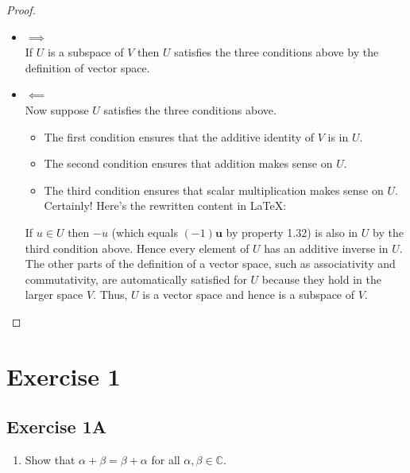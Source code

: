 \documentclass[
]{book}
\providecommand{\tightlist}{%
  \setlength{\itemsep}{0pt}\setlength{\parskip}{0pt}}
\theoremstyle{definition}
\theoremstyle{definition}
\theoremstyle{definition}
\theoremstyle{definition}
\theoremstyle{remark}
\begin{document}
\begin{proof}
\leavevmode

\begin{itemize}
\item
  \(\implies\)\\
  If \(U\) is a subspace of \(V\) then \(U\)
  satisfies the three conditions above by the
  definition of vector space.
\item
  \(\impliedby\)\\
  Now suppose \(U\) satisfies the three conditions above.

  \begin{itemize}
  \tightlist
  \item
    The first condition ensures that the additive identity of \(V\) is in \(U\).
  \item
    The second condition ensures that addition makes sense on \(U\).
  \item
    The third condition ensures that scalar multiplication makes sense on \(U\).
    Certainly! Here's the rewritten content in LaTeX:
  \end{itemize}

  If \({u} \in U\) then \(-{u}\) (which equals \((-1)\mathbf{u}\) by property 1.32) is also in \(U\) by the third condition above. Hence every element of \(U\) has an additive inverse in \(U\). The other parts of the definition of a vector space, such as associativity and commutativity, are automatically satisfied for \(U\) because they hold in the larger space \(V\). Thus, \(U\) is a vector space and hence is a subspace of \(V\).
\end{itemize}

\end{proof}

\chapter{Exercise 1}\label{exercise-1}

\section{Exercise 1A}\label{exercise-1a}

\begin{enumerate}
\def\labelenumi{\arabic{enumi}.}
\tightlist
\item
  Show that \(\alpha + \beta = \beta + \alpha\) for all \(\alpha, \beta \in \mathbb{C}\).
\end{enumerate}
\end{document}
